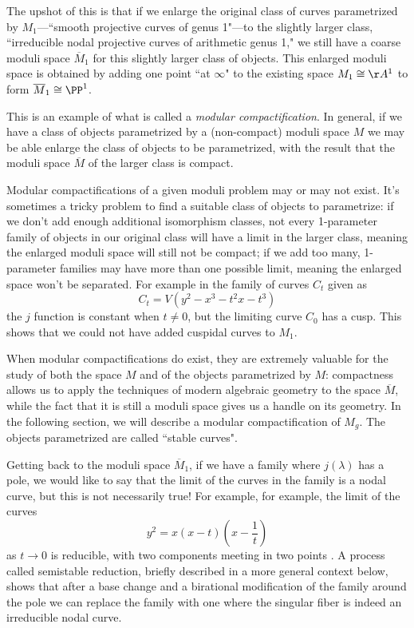 
The upshot of this is that if we enlarge the original class of curves parametrized by $M_1$---``smooth projective curves of genus 1"---to the slightly larger class, ``irreducible nodal projective curves of arithmetic genus 1," we still have a coarse moduli space $\overline M_1$ for this slightly larger class of objects. This enlarged moduli space is obtained by adding one point ``at $\infty$" to the existing space $M_1 \cong \AA^1$ to form $\overline M_1 \cong \PP^1$.

This is an example of what is called a \emph{modular compactification}. In general, if we have a class of objects parametrized by a (non-compact) moduli space $M$ we may be able enlarge the class of objects to be parametrized, with the result that the moduli space $\overline M$ of the larger class is compact. 

Modular compactifications of a given moduli problem may or may not exist. It's sometimes a tricky problem to find a suitable class of objects to parametrize: if we don't add enough additional isomorphism classes, not every 1-parameter family of objects in our original class will have a limit in the larger class, meaning the enlarged moduli space will still not be compact; if we add too many,  1-parameter families may have more than one possible limit, meaning the enlarged space won't be separated. For example in the family
 of curves $C_t$ given as
$$
C_t = V(y^2 -x^3 - t^2x - t^3)
$$
the $j$ function is constant when $t\neq 0$, but  the limiting curve $C_0$ has a cusp. This shows that
we could not have added cuspidal curves to $M_1$.

 When modular compactifications do exist, they are extremely valuable for the study of both the space $M$ and of the objects parametrized by $M$: compactness allows us to apply the techniques of modern algebraic geometry to the space $\overline M$, while the fact that it is still a moduli space gives us a handle on its geometry. In the following section, we will describe a modular compactification of $M_g$. The objects parametrized are called ``stable curves". 

Getting back to the moduli space $\overline M_1$, if we have a family where
$j(\lambda)$ has a pole, we would like to say that the limit of the curves in the family is a nodal curve,
but this is not necessarily true! For example, for example, the limit of the curves
$$
y^2 = x(x-t)(x-\frac{1}{t})
$$
as $t \to 0$ is reducible, with two components meeting in two points . A process called semistable reduction, briefly described in a more general context below, shows that after a base change and a birational
modification of the family around the pole we can replace the family with one where the singular fiber
is indeed an irreducible nodal curve.
